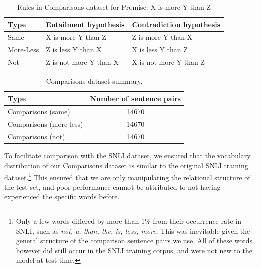 \begin{table}[htb]
  \begin{center}
  \begin{tabular}{p{20mm} p{45mm} p{45mm}} 
 \toprule
 Type & Entailment hypothesis & Contradiction hypothesis\\
 \midrule
    
Same & 
X is more Y than Z  &
 Z is more Y than X \\
 
More-Less &
Z is less Y than X  &
X is less Y than Z  \\
 
Not &
Z is not more Y than X  &
X is not more Y than Z  \\
\bottomrule
\end{tabular}
 \caption{Rules in Comparisons dataset for Premise: X is more Y than Z}
  \label{tab:rules}
  \end{center}
\end{table}


\begin{table}[htb]
  \begin{center}
  \begin{tabular}{p{60mm} c} 
 \toprule
 Type & Number of sentence pairs \\ [0.5ex] 
 \midrule
  Comparisons (same)  &  14670\\
 Comparisons (more-less)  &  14670\\
 Comparisons (not)  &  14670\\
 \bottomrule
\end{tabular}
 \caption{Comparisons dataset summary.}
  \label{tab:dataset}
  \end{center}
\end{table}

To facilitate comparison with the SNLI dataset, we ensured that the vocabulary distribution of our Comparisons dataset is similar to the original SNLI training dataset.\footnote{Only a few words differed by more than $1 \%$ from their occurrence rate in SNLI, such as \textit{not, a, than, the, is, less, more}. This was inevitable given the general structure of the comparison sentence pairs we use. All of these words however did still occur in the SNLI training corpus, and were not new to the model at test time.} This ensured that we are only manipulating the relational structure of the test set, and poor performance cannot be attributed to not having experienced the specific words before.

